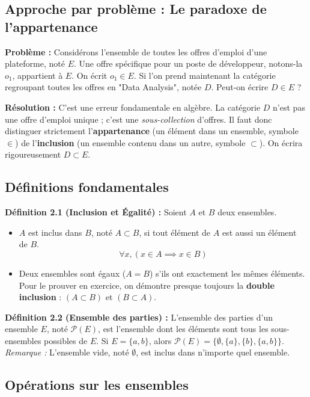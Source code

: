 \subsection{Approche par problème : Le paradoxe de l'appartenance}
\textbf{Problème :} Considérons l'ensemble de toutes les offres d'emploi d'une plateforme, noté $E$. Une offre spécifique pour un poste de développeur, notons-la $o_1$, appartient à $E$. On écrit $o_1 \in E$. Si l'on prend maintenant la catégorie regroupant toutes les offres en "Data Analysis", notée $D$. Peut-on écrire $D \in E$ ?

\textbf{Résolution :} C'est une erreur fondamentale en algèbre. La catégorie $D$ n'est pas une offre d'emploi unique ; c'est une \textit{sous-collection} d'offres. Il faut donc distinguer strictement l'\textbf{appartenance} (un élément dans un ensemble, symbole $\in$) de l'\textbf{inclusion} (un ensemble contenu dans un autre, symbole $\subset$). On écrira rigoureusement $D \subset E$.

\subsection{Définitions fondamentales}
\textbf{Définition 2.1 (Inclusion et Égalité) :}
Soient $A$ et $B$ deux ensembles.
\begin{itemize}
    \item $A$ est inclus dans $B$, noté $A \subset B$, si tout élément de $A$ est aussi un élément de $B$.
    $$ \forall x, (x \in A \implies x \in B) $$
    \item Deux ensembles sont égaux ($A = B$) s'ils ont exactement les mêmes éléments. Pour le prouver en exercice, on démontre presque toujours la \textbf{double inclusion} : $(A \subset B)$ et $(B \subset A)$.
\end{itemize}

\textbf{Définition 2.2 (Ensemble des parties) :}
L'ensemble des parties d'un ensemble $E$, noté $\mathcal{P}(E)$, est l'ensemble dont les éléments sont tous les sous-ensembles possibles de $E$.
Si $E = \{a, b\}$, alors $\mathcal{P}(E) = \{\emptyset, \{a\}, \{b\}, \{a, b\}\}$.
\textit{Remarque :} L'ensemble vide, noté $\emptyset$, est inclus dans n'importe quel ensemble.

\subsection{Opérations sur les ensembles}


